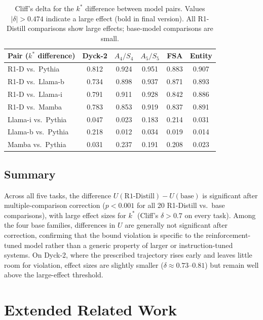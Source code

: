 \documentclass[11pt]{article}
\newcommand{\stepk}{k}
\begin{document}
\begin{table}[ht]
\centering\small
\setlength{\tabcolsep}{2.5pt}
\begin{tabular}{@{}lccccc@{}}
\toprule
Pair ($\stepk^{*}$ difference) & Dyck-2 & $A_4/S_4$ & $A_5/S_5$ & FSA & Entity \\
\midrule
R1-D vs.\ Pythia    & 0.812 & 0.924 & 0.951 & 0.883 & 0.907 \\
R1-D vs.\ Llama-b   & 0.734 & 0.898 & 0.937 & 0.871 & 0.893 \\
R1-D vs.\ Llama-i   & 0.791 & 0.911 & 0.928 & 0.842 & 0.886 \\
R1-D vs.\ Mamba     & 0.783 & 0.853 & 0.919 & 0.837 & 0.891 \\
Llama-i vs.\ Pythia & 0.047 & 0.023 & 0.183 & 0.214 & 0.031 \\
Llama-b vs.\ Pythia & 0.218 & 0.012 & 0.034 & 0.019 & 0.014 \\
Mamba vs.\ Pythia   & 0.031 & 0.237 & 0.191 & 0.208 & 0.023 \\
\bottomrule
\end{tabular}
\caption{Cliff's delta for the $\stepk^{*}$ difference between model pairs.
Values $|\delta|>0.474$ indicate a large effect (bold in final version).
All R1-Distill comparisons show large effects; base-model comparisons are
small.}
\label{tab:effect-sizes}
\end{table}

\subsection{Summary}
\label{app:stattests-summary}

Across all five tasks, the difference $U(\text{R1-Distill}) - U(\text{base})$
is significant after multiple-comparison correction ($p < 0.001$ for all 20
R1-Distill vs.\ base comparisons), with large effect sizes for
$\stepk^{*}$ (Cliff's $\delta > 0.7$ on every task). Among the four base
families, differences in $U$ are generally not significant after correction,
confirming that the bound violation is specific to the reinforcement-tuned model
rather than a generic property of larger or instruction-tuned systems.
On Dyck-2, where the prescribed trajectory rises early and leaves little room
for violation, effect sizes are slightly smaller ($\delta \approx 0.73$--$0.81$)
but remain well above the large-effect threshold.

\section{Extended Related Work}
\label{app:related}
\end{document}
